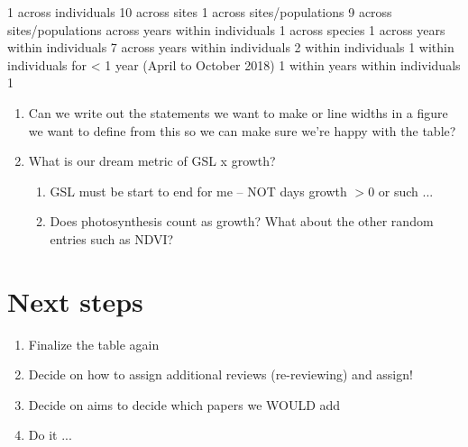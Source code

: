 \documentclass[11pt]{article}
\begin{document}
\newpage
\begin{Schunk}
\begin{Soutput}
                                                       1 
                                      across individuals 
                                                      10 
                                            across sites 
                                                       1 
                                across sites/populations 
                                                       9 
across sites/populations across years within individuals 
                                                       1 
                                          across species 
                                                       1 
                         across years within individuals 
                                                       7 
                 across years within individuals 
                                                       2 
                                      within individuals 
                                                       1 
 within individuals for < 1 year (April to October 2018) 
                                                       1 
                         within years within individuals 
                                                       1 
\end{Soutput}
\end{Schunk}


\begin{enumerate}
\item Can we write out the statements we want to make or line widths in a figure we want to define from this so we can make sure we're happy with the table?
\item What is our dream metric of GSL x growth?
\begin{enumerate}
\item GSL must be start to end for me -- NOT days growth $>$0 or such ... 
\item Does photosynthesis count as growth? What about the other random entries such as NDVI?
\end{enumerate}
\end{enumerate}

\section{Next steps}

\begin{enumerate}
\item Finalize the table again
\item Decide on how to assign additional reviews (re-reviewing) and assign!
\item Decide on aims to decide which papers we WOULD add
\item Do it ... 
\end{enumerate}
\end{document}
